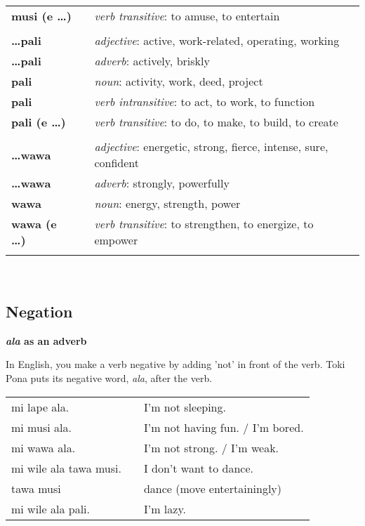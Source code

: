 \begin{supertabular}{p{2,5cm}|ll}
\textbf{musi (e \dots)} && \textit{verb transitive}: to amuse, to entertain \\ %
 && \\ %
\textbf{\dots pali} && \textit{adjective}: active, work-related, operating, working \\ %
\textbf{\dots pali} && \textit{adverb}: actively, briskly \\ %
\textbf{pali} && \textit{noun}: activity, work, deed, project \\ %
\textbf{pali} && \textit{verb intransitive}: to act, to work, to function \\ %
\textbf{pali (e \dots)} && \textit{verb transitive}: to do, to make, to build, to create \\ %
 && \\ %
\textbf{\dots wawa} && \textit{adjective}: energetic, strong, fierce, intense, sure, confident \\ %
\textbf{\dots wawa} && \textit{adverb}: strongly, powerfully \\ %
\textbf{wawa} && \textit{noun}: energy, strength, power \\ %
\textbf{wawa (e \dots)} && \textit{verb transitive}: to strengthen, to energize, to empower \\ %
 && \\ %
\end{supertabular} \\
%
\newpage
{}
\subsection*{Negation}
%
\textbf{\textit{ala} as an adverb}

In English, you make a verb negative by adding 'not' in front of the verb.
Toki Pona puts its negative word, \textit{ala}, after the verb. 

\begin{supertabular}{p{5,5cm}|ll}
mi lape ala. && I'm not sleeping. \\ 
mi musi ala. && I'm not having fun. / I'm bored. \\
mi wawa ala. && I'm not strong. / I'm weak. \\
mi wile ala tawa musi. && I don't want to dance. \\
tawa musi && dance (move entertainingly) \\
mi wile ala pali. && I'm lazy. \\
\end{supertabular} 

